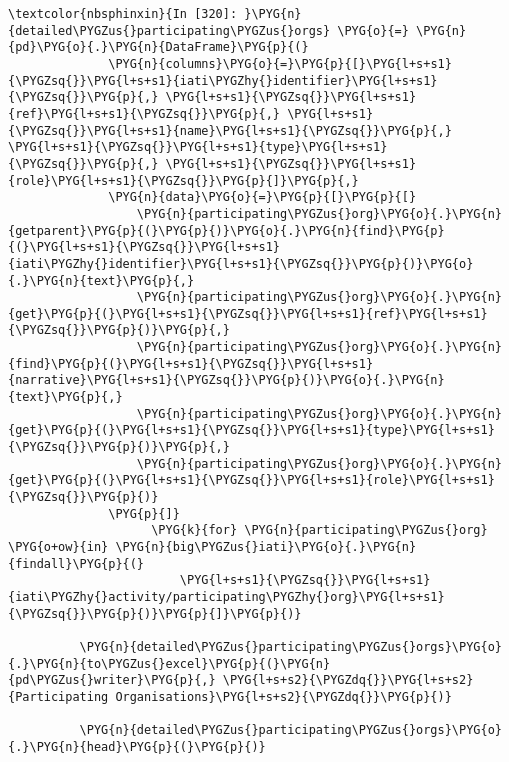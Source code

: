 \documentclass[letterpaper,10pt,english]{sphinxmanual}
\begin{document}
\begin{Verbatim}[commandchars=\\\{\}]
\textcolor{nbsphinxin}{In [320]: }\PYG{n}{detailed\PYGZus{}participating\PYGZus{}orgs} \PYG{o}{=} \PYG{n}{pd}\PYG{o}{.}\PYG{n}{DataFrame}\PYG{p}{(}
              \PYG{n}{columns}\PYG{o}{=}\PYG{p}{[}\PYG{l+s+s1}{\PYGZsq{}}\PYG{l+s+s1}{iati\PYGZhy{}identifier}\PYG{l+s+s1}{\PYGZsq{}}\PYG{p}{,} \PYG{l+s+s1}{\PYGZsq{}}\PYG{l+s+s1}{ref}\PYG{l+s+s1}{\PYGZsq{}}\PYG{p}{,} \PYG{l+s+s1}{\PYGZsq{}}\PYG{l+s+s1}{name}\PYG{l+s+s1}{\PYGZsq{}}\PYG{p}{,} \PYG{l+s+s1}{\PYGZsq{}}\PYG{l+s+s1}{type}\PYG{l+s+s1}{\PYGZsq{}}\PYG{p}{,} \PYG{l+s+s1}{\PYGZsq{}}\PYG{l+s+s1}{role}\PYG{l+s+s1}{\PYGZsq{}}\PYG{p}{]}\PYG{p}{,}
              \PYG{n}{data}\PYG{o}{=}\PYG{p}{[}\PYG{p}{[}
                  \PYG{n}{participating\PYGZus{}org}\PYG{o}{.}\PYG{n}{getparent}\PYG{p}{(}\PYG{p}{)}\PYG{o}{.}\PYG{n}{find}\PYG{p}{(}\PYG{l+s+s1}{\PYGZsq{}}\PYG{l+s+s1}{iati\PYGZhy{}identifier}\PYG{l+s+s1}{\PYGZsq{}}\PYG{p}{)}\PYG{o}{.}\PYG{n}{text}\PYG{p}{,}
                  \PYG{n}{participating\PYGZus{}org}\PYG{o}{.}\PYG{n}{get}\PYG{p}{(}\PYG{l+s+s1}{\PYGZsq{}}\PYG{l+s+s1}{ref}\PYG{l+s+s1}{\PYGZsq{}}\PYG{p}{)}\PYG{p}{,}
                  \PYG{n}{participating\PYGZus{}org}\PYG{o}{.}\PYG{n}{find}\PYG{p}{(}\PYG{l+s+s1}{\PYGZsq{}}\PYG{l+s+s1}{narrative}\PYG{l+s+s1}{\PYGZsq{}}\PYG{p}{)}\PYG{o}{.}\PYG{n}{text}\PYG{p}{,}
                  \PYG{n}{participating\PYGZus{}org}\PYG{o}{.}\PYG{n}{get}\PYG{p}{(}\PYG{l+s+s1}{\PYGZsq{}}\PYG{l+s+s1}{type}\PYG{l+s+s1}{\PYGZsq{}}\PYG{p}{)}\PYG{p}{,}
                  \PYG{n}{participating\PYGZus{}org}\PYG{o}{.}\PYG{n}{get}\PYG{p}{(}\PYG{l+s+s1}{\PYGZsq{}}\PYG{l+s+s1}{role}\PYG{l+s+s1}{\PYGZsq{}}\PYG{p}{)}
              \PYG{p}{]}
                    \PYG{k}{for} \PYG{n}{participating\PYGZus{}org} \PYG{o+ow}{in} \PYG{n}{big\PYGZus{}iati}\PYG{o}{.}\PYG{n}{findall}\PYG{p}{(}
                        \PYG{l+s+s1}{\PYGZsq{}}\PYG{l+s+s1}{iati\PYGZhy{}activity/participating\PYGZhy{}org}\PYG{l+s+s1}{\PYGZsq{}}\PYG{p}{)}\PYG{p}{]}\PYG{p}{)}
          
          \PYG{n}{detailed\PYGZus{}participating\PYGZus{}orgs}\PYG{o}{.}\PYG{n}{to\PYGZus{}excel}\PYG{p}{(}\PYG{n}{pd\PYGZus{}writer}\PYG{p}{,} \PYG{l+s+s2}{\PYGZdq{}}\PYG{l+s+s2}{Participating Organisations}\PYG{l+s+s2}{\PYGZdq{}}\PYG{p}{)}
          
          \PYG{n}{detailed\PYGZus{}participating\PYGZus{}orgs}\PYG{o}{.}\PYG{n}{head}\PYG{p}{(}\PYG{p}{)}
\end{Verbatim}
\end{document}
